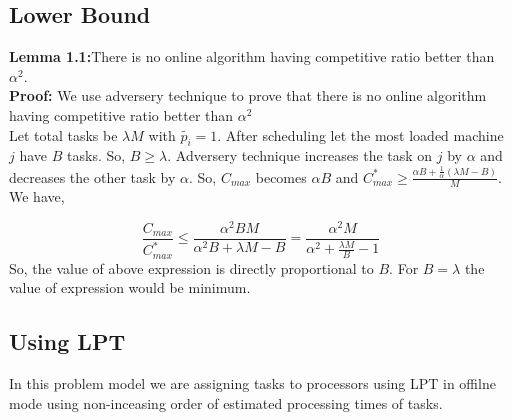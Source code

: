 \documentclass[10pt, conference, compsocconf]{IEEEtran}
\begin{document}
                                                                                                                                                                                                                                                                                                                                                                                                                                                                                                                                                                                                                                                                                                                                                                                                                                                                                                                                                                                                          
\subsection{Lower Bound}
\textbf{Lemma 1.1:}There is no online algorithm having competitive  ratio better than $\alpha^{2} $.\\
\textbf{Proof:} We  use adversery technique to prove that there is no online algorithm having competitive  ratio better than $\alpha^{2} $\\
 
 Let total tasks be $\lambda M$ with $\tilde{p_i}=1$. After scheduling let the most loaded machine $j$ have $B$ tasks. So, $B \geq \lambda$. Adversery technique increases the task on $j$ by $\alpha$ and decreases the other task by $\alpha$. So, $ C_{max}$ becomes $\alpha B$ and ${C^{*}_{max}}\geq \frac{\alpha B + \frac{1}{\alpha }  (\lambda  M - B) }{M}$. We have,
 
 \begin{equation}\nonumber
\frac{C_{max}}{C^{*}_{max}}\leq \frac{\alpha^{2} B M }{\alpha^{2} B + \lambda M - B}=\frac{\alpha^{2}  M }{\alpha^{2}  + \frac{\lambda M}{B}  - 1}
 \end{equation} 
 So, the value of above expression is directly proportional to $B$. For $B= \lambda$ the value of expression would be minimum. 
 
 
\subsection{Using LPT}

In this problem model we are assigning tasks to processors using LPT in offilne mode using non-inceasing order of estimated processing times of tasks.
\end{document}
